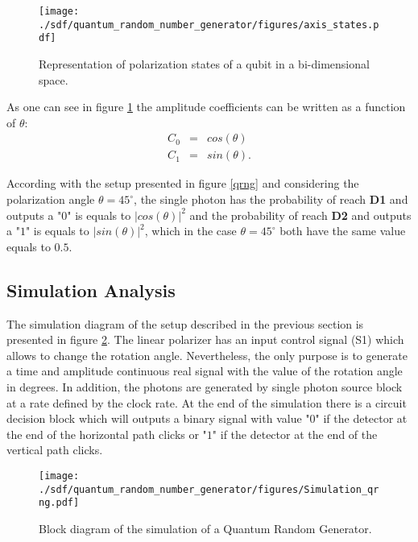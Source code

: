 \begin{refsection}
\begin{figure}[h]
    \centering
        \texttt{[image: ./sdf/quantum\_random\_number\_generator/figures/axis\_states.pdf]}
    \caption{Representation of polarization states of a qubit in a bi-dimensional space.}\label{fig:stateaxis}
\end{figure}

As one can see in figure \ref{fig:stateaxis} the amplitude coefficients can be written as a function of $\theta$:
\begin{eqnarray}
  C_0 &=& cos(\theta) \\
  C_1 &=& sin(\theta).
\end{eqnarray}

According with the setup presented in figure \ref{qrng} and considering the polarization angle $\theta = 45^{\circ}$, the single photon has the probability of reach \textbf{D1} and outputs a "$0$" is equals to $|cos(\theta)|^2$ and the probability of reach \textbf{D2} and outputs a "$1$" is equals to $|sin(\theta)|^2$, which in the case $\theta = 45^{\circ}$ both have the same value equals to $0.5$.

\subsection{Simulation Analysis}
The simulation diagram of the setup described in the previous section is presented in figure \ref{sim_qrng}. The linear polarizer has an input control signal (S1) which allows to change the rotation angle. Nevertheless, the only purpose is to generate a time and amplitude continuous real signal with the value of the rotation angle in degrees. In addition, the photons are generated by single photon source block at a rate defined by the clock rate. At the end of the simulation there is a circuit decision block which will outputs a binary signal with value "$0$" \space if the detector at the end of the horizontal path clicks or "$1$" \space if the detector at the end of the vertical path clicks.

\begin{figure}[h]
    \centering
        \texttt{[image: ./sdf/quantum\_random\_number\_generator/figures/Simulation\_qrng.pdf]}
    \caption{Block diagram of the simulation of a Quantum Random Generator.}\label{sim_qrng}
\end{figure}


\end{refsection}

